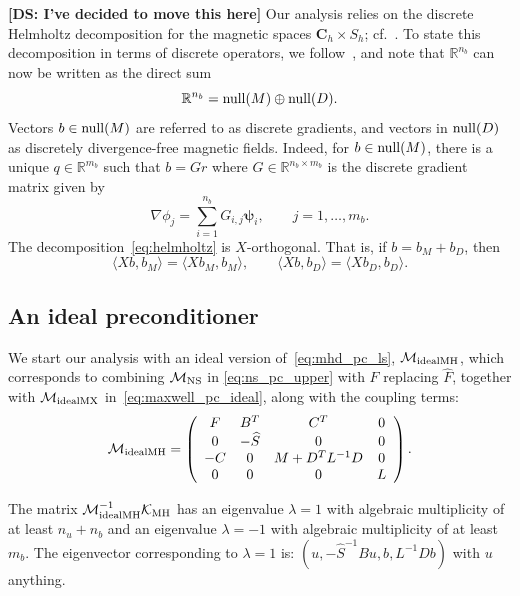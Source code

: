\documentclass{siamltex}
\newcommand{\uu}[1]{\boldsymbol #1}                     %
\begin{document}
{\bf [DS: I've decided to move this here]}
Our analysis relies on the discrete Helmholtz decomposition for the magnetic spaces $\uu{C}_h\times S_h$; cf.~\cite{asdf}.  To state this decomposition in terms of discrete operators, we follow~\cite[Section~2]{Greif07}, and note that $\mathbb{R}^{n_b}$ can now be written as the direct sum
\begin{equation}
\label{eq:helmholtz}
\mathbb{R}^{n_b}={\rm null}(M)\oplus {\rm null}(D).
\end{equation}
Vectors $b\in{\rm null}(M)$ are referred to as discrete gradients, and vectors in ${\rm null}(D)$
as discretely divergence-free magnetic fields. Indeed, for $b\in{\rm null}(M)$, there
is a unique $q\in\mathbb{R}^{m_b}$ such that $b=G r$ where $G\in\mathbb{R}^{n_b\times m_b}$ is the discrete gradient matrix given by
\begin{equation}
\label{eq:gradient}
\nabla \phi_j=\sum_{i=1}^{n_b} G_{i,j} \uu{\psi}_i, \qquad j=1,\ldots,m_b.
\end{equation}
The decomposition~\eqref{eq:helmholtz} is $X$-orthogonal. That is, if $b=b_M+b_D$, then
\begin{equation}
\label{eq:orth}
\langle Xb, b_M\rangle=\langle X b_M, b_M \rangle,\qquad \langle Xb, b_D\rangle= \langle X b_D,b_D\rangle.
\end{equation}



\subsection{An ideal preconditioner}

We start our analysis with an ideal version of~\eqref{eq:mhd_pc_ls}, $\mathcal{M}_{\rm idealMH}$, which corresponds
to combining ${\mathcal M}_{\rm NS}$ in \eqref{eq:ns_pc_upper} with $F$ replacing $\widehat{F}$, together with ${\mathcal M}_{\rm idealMX}$ in~\eqref{eq:maxwell_pc_ideal}, along with the coupling terms: %
\begin{equation}
\label{eq:mhd_pc_ideal}
\mathcal{M}_{\rm idealMH} =
\left(
\begin{array}{cccc}
F & B^T & C^T & 0\\
0 & -\widehat{S} & 0 & 0 \\
-C & 0 & M + D^T L^{-1} D & 0\\
0 & 0 & 0 & L
\end{array}
\right).
\end{equation}


\begin{theorem}
\label{thm:mhd_outer_ideal}
The matrix $\mathcal{M}_{\rm idealMH}^{-1} \mathcal{K}_{\rm MH} $ has an eigenvalue $\lambda = 1$ with algebraic multiplicity of at least $n_u + n_b$ and an eigenvalue $\lambda = -1$ with  algebraic multiplicity of at least $m_b$. The eigenvector corresponding to $\lambda=1$ is: $(u, -\widehat{S}^{-1} B u, b, L^{-1} D b)$ with $u$ anything.
\end{theorem}
\end{document}
